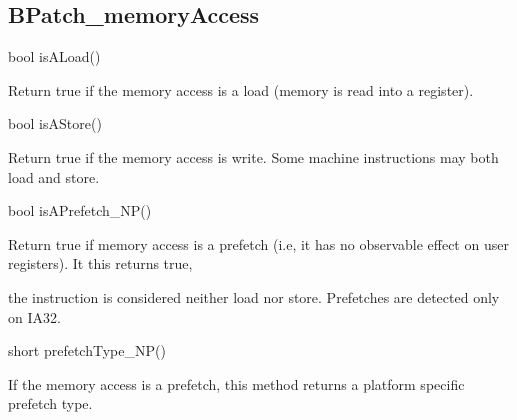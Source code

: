 \subsection{BPatch_memoryAccess}

\label{bkm:Ref160278502}\label{bkm:Ref160277443}





\bigskip



{

bool isALoad()}



{

Return true if the memory access is a load (memory is read into a register).}



{

bool isAStore()}



{

Return true if the memory access is write. Some machine instructions may both load and store.}



{

bool isAPrefetch_NP()}



{

Return true if memory access is a prefetch (i.e, it has no observable effect on user registers). It this returns true,

the instruction is considered neither load nor store. Prefetches are detected only on IA32.}



{

short prefetchType_NP()}



{

If the memory access is a prefetch, this method returns a platform specific prefetch type.}



